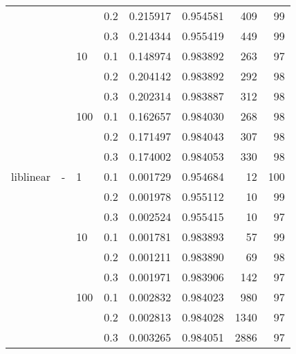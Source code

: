 \begin{table}[H]
\begin{tabular}{llllrrrr}
          &   &     & 0.2 &  0.215917 &  0.954581 &     409 &    99 \\
          &   &     & 0.3 &  0.214344 &  0.955419 &     449 &    99 \\
          &   & 10  & 0.1 &  0.148974 &  0.983892 &     263 &    97 \\
          &   &     & 0.2 &  0.204142 &  0.983892 &     292 &    98 \\
          &   &     & 0.3 &  0.202314 &  0.983887 &     312 &    98 \\
          &   & 100 & 0.1 &  0.162657 &  0.984030 &     268 &    98 \\
          &   &     & 0.2 &  0.171497 &  0.984043 &     307 &    98 \\
          &   &     & 0.3 &  0.174002 &  0.984053 &     330 &    98 \\
liblinear & - & 1   & 0.1 &  0.001729 &  0.954684 &      12 &   100 \\
          &   &     & 0.2 &  0.001978 &  0.955112 &      10 &    99 \\
          &   &     & 0.3 &  0.002524 &  0.955415 &      10 &    97 \\
          &   & 10  & 0.1 &  0.001781 &  0.983893 &      57 &    99 \\
          &   &     & 0.2 &  0.001211 &  0.983890 &      69 &    98 \\
          &   &     & 0.3 &  0.001971 &  0.983906 &     142 &    97 \\
          &   & 100 & 0.1 &  0.002832 &  0.984023 &     980 &    97 \\
          &   &     & 0.2 &  0.002813 &  0.984028 &    1340 &    97 \\
          &   &     & 0.3 &  0.003265 &  0.984051 &    2886 &    97 \\
\bottomrule
\end{tabular}
\end{table}
